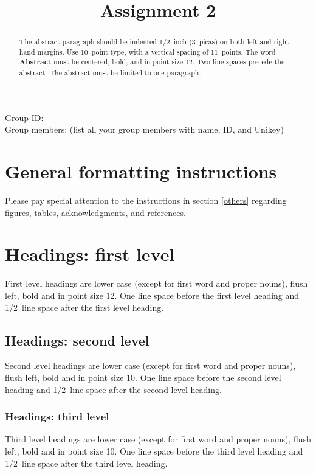 \documentclass{article} %
\title{Assignment 2}
\begin{document}
\maketitle

Group ID: \\
Group members: (list all your group members with name, ID, and Unikey)\\

\begin{abstract}
The abstract paragraph should be indented 1/2~inch (3~picas) on both left and
right-hand margins. Use 10~point type, with a vertical spacing of 11~points.
The word \textbf{Abstract} must be centered, bold, and in point size 12. Two
line spaces precede the abstract. The abstract must be limited to one
paragraph.
\end{abstract}


\section{General formatting instructions}
\label{gen_inst}

Please pay special attention to the instructions in section \ref{others}
regarding figures, tables, acknowledgments, and references.

\section{Headings: first level}
\label{headings}

First level headings are lower case (except for first word and proper nouns),
flush left, bold and in point size 12. One line space before the first level
heading and 1/2~line space after the first level heading.

\subsection{Headings: second level}

Second level headings are lower case (except for first word and proper nouns),
flush left, bold and in point size 10. One line space before the second level
heading and 1/2~line space after the second level heading.

\subsubsection{Headings: third level}

Third level headings are lower case (except for first word and proper nouns),
flush left, bold and in point size 10. One line space before the third level
heading and 1/2~line space after the third level heading.
\end{document}
